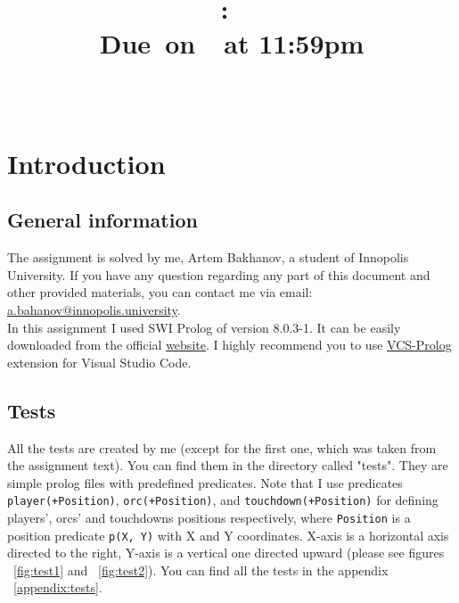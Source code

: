 \documentclass{article}
\title{
    \vspace{2in}
    \textmd{\textbf{\hmwkClass:\ \hmwkTitle}}\\
    \normalsize\vspace{0.1in}\small{Due\ on\ \hmwkDueDate\ at 11:59pm}\\
    \vspace{0.1in}\large{\textit{\hmwkClassInstructor\ }}
    \vspace{3in}
}
\author{\hmwkAuthorName}
\date{}
\begin{document}
\maketitle

\pagebreak

\tableofcontents

\pagebreak

\section{Introduction}
\subsection{General information}
    The assignment is solved by me, Artem Bakhanov, a student of Innopolis University. If you have any question regarding any part of this document and other provided materials, you can contact me via email: \href{mailto:a.bahanov@innopolis.university}{a.bahanov@innopolis.university}.\\
    In this assignment I used SWI Prolog of version 8.0.3-1. It can be easily downloaded from the official \href{https://www.swi-prolog.org/download/stable}{website}. I highly recommend you to use \href{https://marketplace.visualstudio.com/items?itemName=arthurwang.vsc-prolog}{VCS-Prolog} extension for Visual Studio Code. 
\subsection{Tests}
All the tests are created by me (except for the first one, which was taken from the assignment text). You can find them in the directory called "tests". They are simple prolog files with predefined predicates. Note that I use predicates \texttt{player(+Position)}, \texttt{orc(+Position)}, and \texttt{touchdown(+Position)} for defining players', orcs' and touchdowns positions respectively, where \texttt{Position} is a position predicate \texttt{p(X, Y)} with X and Y coordinates. X-axis is a horizontal axis directed to the right, Y-axis is a vertical one directed upward (please see figures ~\ref{fig:test1} and ~\ref{fig:test2}). You can find all the tests in the appendix ~\ref{appendix:tests}.

\end{document}
